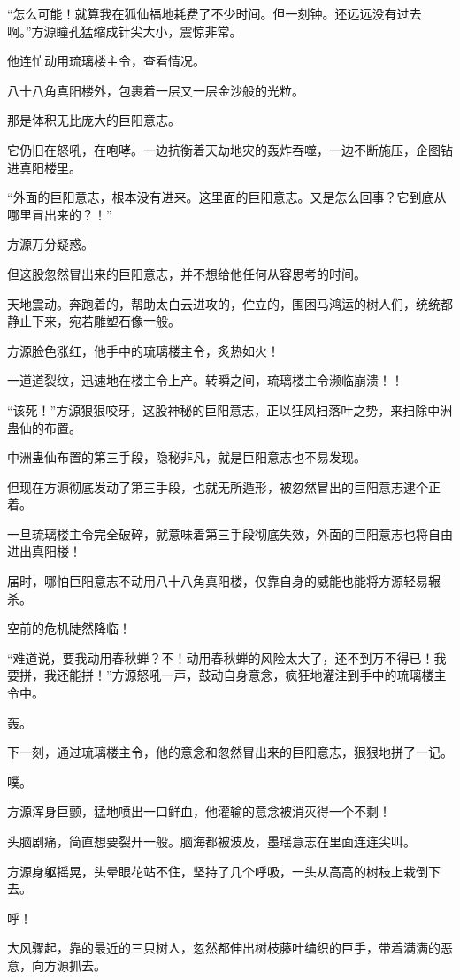 \begin{this_body}
“怎么可能！就算我在狐仙福地耗费了不少时间。但一刻钟。还远远没有过去啊。”方源瞳孔猛缩成针尖大小，震惊非常。

他连忙动用琉璃楼主令，查看情况。

八十八角真阳楼外，包裹着一层又一层金沙般的光粒。

那是体积无比庞大的巨阳意志。

它仍旧在怒吼，在咆哮。一边抗衡着天劫地灾的轰炸吞噬，一边不断施压，企图钻进真阳楼里。

“外面的巨阳意志，根本没有进来。这里面的巨阳意志。又是怎么回事？它到底从哪里冒出来的？！”

方源万分疑惑。

但这股忽然冒出来的巨阳意志，并不想给他任何从容思考的时间。

天地震动。奔跑着的，帮助太白云进攻的，伫立的，围困马鸿运的树人们，统统都静止下来，宛若雕塑石像一般。

方源脸色涨红，他手中的琉璃楼主令，炙热如火！

一道道裂纹，迅速地在楼主令上产。转瞬之间，琉璃楼主令濒临崩溃！！

“该死！”方源狠狠咬牙，这股神秘的巨阳意志，正以狂风扫落叶之势，来扫除中洲蛊仙的布置。

中洲蛊仙布置的第三手段，隐秘非凡，就是巨阳意志也不易发现。

但现在方源彻底发动了第三手段，也就无所遁形，被忽然冒出的巨阳意志逮个正着。

一旦琉璃楼主令完全破碎，就意味着第三手段彻底失效，外面的巨阳意志也将自由进出真阳楼！

届时，哪怕巨阳意志不动用八十八角真阳楼，仅靠自身的威能也能将方源轻易辗杀。

空前的危机陡然降临！

“难道说，要我动用春秋蝉？不！动用春秋蝉的风险太大了，还不到万不得已！我要拼，我还能拼！”方源怒吼一声，鼓动自身意念，疯狂地灌注到手中的琉璃楼主令中。

轰。

下一刻，通过琉璃楼主令，他的意念和忽然冒出来的巨阳意志，狠狠地拼了一记。

噗。

方源浑身巨颤，猛地喷出一口鲜血，他灌输的意念被消灭得一个不剩！

头脑剧痛，简直想要裂开一般。脑海都被波及，墨瑶意志在里面连连尖叫。

方源身躯摇晃，头晕眼花站不住，坚持了几个呼吸，一头从高高的树枝上栽倒下去。

呼！

大风骤起，靠的最近的三只树人，忽然都伸出树枝藤叶编织的巨手，带着满满的恶意，向方源抓去。


\end{this_body}
